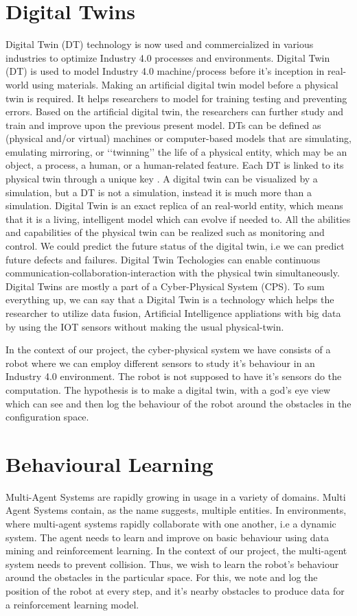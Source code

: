 \section{Digital Twins}
Digital Twin (DT) technology is now used and commercialized in various industries to optimize Industry 4.0 processes and environments. 
Digital Twin (DT) is used to model Industry 4.0 machine/process before it's inception in real-world using materials.
Making an artificial digital twin model before a physical twin is required. It helps researchers to model for training testing and preventing errors. 
Based on the artificial digital twin, the researchers can further study and train and improve upon the previous present model. DTs can be defined as (physical and/or virtual) machines
or computer-based models that are simulating, emulating 
mirroring, or ‘‘twinning’’ the life of a physical entity, which
may be an object, a process, a human, or a human-related feature. Each DT is linked to its physical twin through a unique
key \cite{8901113}. A digital twin can be visualized by a simulation, but a DT is not a simulation, instead it is much more than a simulation. Digital Twin is an exact replica of 
an real-world entity, which means that it is a living, intelligent model which can evolve if needed to. All the abilities and capabilities of the physical twin can be realized such as monitoring and control.
We could predict the future status of the digital twin, i.e we can predict future defects and failures. Digital Twin Techologies can enable continuous communication-collaboration-interaction with the 
physical twin simultaneously. Digital Twins are mostly a part of a Cyber-Physical System (CPS). To sum everything up, we can say that a Digital Twin is a technology which helps the researcher to 
utilize data fusion, Artificial Intelligence appliations with big data by using the IOT sensors without making the usual physical-twin.

In the context of our project, the cyber-physical system we have consists of a robot where we can employ different sensors to study it's behaviour in an Industry 4.0 environment. The robot is not supposed to have it's sensors do the computation.
The hypothesis is to make a digital twin, with a god's eye view which can see and then log the behaviour of the robot around the obstacles in the configuration space.

\section{Behavioural Learning}
Multi-Agent Systems are rapidly growing in usage in a variety of domains. Multi Agent Systems contain, as the name suggests, multiple entities. 
In environments, where multi-agent systems rapidly collaborate with one another, i.e a dynamic system. The agent needs to learn and improve on basic behaviour using data mining and reinforcement learning.
In the context of our project, the multi-agent system needs to prevent collision. Thus, we wish to learn the robot's behaviour around the obstacles in the particular space. For this, we note and log the position of the robot
at every step, and it's nearby obstacles to produce data for a reinforcement learning model.